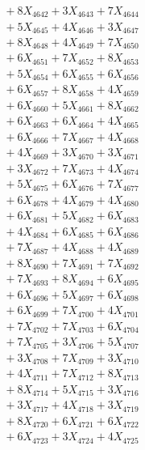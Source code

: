 \documentclass[a4paper,10pt]{article}
\begin{document}
{\begin{align}
&\;  + 8 X_{4642} + 3 X_{4643} + 7 X_{4644} \\[0.3ex]
&\;  + 5 X_{4645} + 4 X_{4646} + 3 X_{4647} \\[0.3ex]
&\;  + 8 X_{4648} + 4 X_{4649} + 7 X_{4650} \\[0.3ex]
&\;  + 6 X_{4651} + 7 X_{4652} + 8 X_{4653} \\[0.3ex]
&\;  + 5 X_{4654} + 6 X_{4655} + 6 X_{4656} \\[0.3ex]
&\;  + 6 X_{4657} + 8 X_{4658} + 4 X_{4659} \\[0.5ex]\allowbreak
&\;  + 6 X_{4660} + 5 X_{4661} + 8 X_{4662} \\[0.3ex]
&\;  + 6 X_{4663} + 6 X_{4664} + 4 X_{4665} \\[0.3ex]
&\;  + 6 X_{4666} + 7 X_{4667} + 4 X_{4668} \\[0.3ex]
&\;  + 4 X_{4669} + 3 X_{4670} + 3 X_{4671} \\[0.3ex]
&\;  + 3 X_{4672} + 7 X_{4673} + 4 X_{4674} \\[0.3ex]
&\;  + 5 X_{4675} + 6 X_{4676} + 7 X_{4677} \\[0.3ex]
&\;  + 6 X_{4678} + 4 X_{4679} + 4 X_{4680} \\[0.3ex]
&\;  + 6 X_{4681} + 5 X_{4682} + 6 X_{4683} \\[0.3ex]
&\;  + 4 X_{4684} + 6 X_{4685} + 6 X_{4686} \\[0.3ex]
&\;  + 7 X_{4687} + 4 X_{4688} + 4 X_{4689} \\[0.5ex]\allowbreak
&\;  + 8 X_{4690} + 7 X_{4691} + 7 X_{4692} \\[0.3ex]
&\;  + 7 X_{4693} + 8 X_{4694} + 6 X_{4695} \\[0.3ex]
&\;  + 6 X_{4696} + 5 X_{4697} + 6 X_{4698} \\[0.3ex]
&\;  + 6 X_{4699} + 7 X_{4700} + 4 X_{4701} \\[0.3ex]
&\;  + 7 X_{4702} + 7 X_{4703} + 6 X_{4704} \\[0.3ex]
&\;  + 7 X_{4705} + 3 X_{4706} + 5 X_{4707} \\[0.3ex]
&\;  + 3 X_{4708} + 7 X_{4709} + 3 X_{4710} \\[0.3ex]
&\;  + 4 X_{4711} + 7 X_{4712} + 8 X_{4713} \\[0.3ex]
&\;  + 8 X_{4714} + 5 X_{4715} + 3 X_{4716} \\[0.3ex]
&\;  + 3 X_{4717} + 4 X_{4718} + 3 X_{4719} \\[0.5ex]\allowbreak
&\;  + 8 X_{4720} + 6 X_{4721} + 6 X_{4722} \\[0.3ex]
&\;  + 6 X_{4723} + 3 X_{4724} + 4 X_{4725} \\[0.3ex]

\end{align}}
\end{document}
